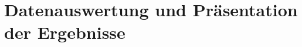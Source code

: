 \section{Datenauswertung und Präsentation der Ergebnisse}
\label{sec:DatenauswertungUndPräsentationDerErgebnisse}
